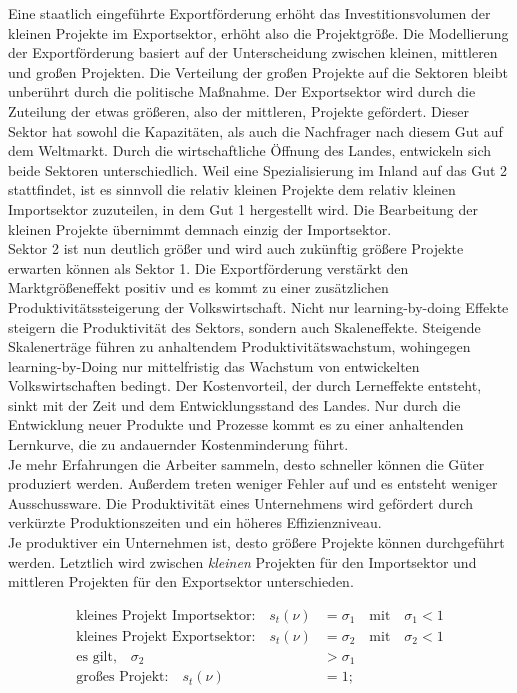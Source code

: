 Eine staatlich eingeführte Exportförderung erhöht das Investitionsvolumen der kleinen Projekte im Exportsektor, erhöht also die Projektgrö{\ss}e. Die Modellierung der Exportförderung basiert auf der Unterscheidung zwischen kleinen, mittleren und gro{\ss}en Projekten. Die Verteilung der gro{\ss}en Projekte auf die Sektoren bleibt unberührt durch die politische Ma{\ss}nahme. Der Exportsektor wird durch die Zuteilung der etwas grö{\ss}eren, also der mittleren, Projekte gefördert.  
Dieser Sektor hat sowohl die Kapazitäten, als auch die Nachfrager nach diesem Gut auf dem Weltmarkt. Durch die wirtschaftliche Öffnung des Landes, entwickeln sich beide Sektoren unterschiedlich. Weil eine Spezialisierung im Inland auf das Gut 2 stattfindet, ist es sinnvoll die relativ kleinen Projekte dem relativ kleinen Importsektor zuzuteilen, in dem Gut 1 hergestellt wird. Die Bearbeitung der kleinen Projekte übernimmt demnach einzig der Importsektor.\\
Sektor 2 ist nun deutlich grö{\ss}er und wird auch zukünftig grö{\ss}ere Projekte erwarten können als Sektor 1. Die Exportförderung verstärkt den Marktgrö{\ss}eneffekt positiv und es kommt zu einer zusätzlichen Produktivitätssteigerung der Volkswirtschaft.  Nicht nur learning-by-doing Effekte steigern die Produktivität des Sektors, sondern auch Skaleneffekte. Steigende Skalenerträge führen zu anhaltendem Produktivitätswachstum, wohingegen learning-by-Doing nur mittelfristig das Wachstum von entwickelten Volkswirtschaften bedingt. Der Kostenvorteil, der durch Lerneffekte entsteht, sinkt mit der Zeit und dem Entwicklungsstand des Landes. Nur durch die Entwicklung neuer Produkte und Prozesse kommt es zu einer anhaltenden Lernkurve, die zu andauernder Kostenminderung führt.\\ 


Je mehr Erfahrungen die Arbeiter sammeln, desto schneller können die Güter produziert werden. Au{\ss}erdem treten weniger Fehler auf und es entsteht weniger Ausschussware. Die Produktivität eines Unternehmens wird gefördert durch verkürzte  Produktionszeiten und ein höheres Effizienzniveau.\\


Je produktiver ein Unternehmen ist, desto grö{\ss}ere Projekte können durchgeführt werden. Letztlich wird zwischen \textit{kleinen} Projekten für den Importsektor und mittleren Projekten für den Exportsektor unterschieden.


	\begin{align*}
		\text{kleines Projekt Importsektor:}\quad s_t(\nu) &= \sigma_1 \quad\text{mit}\quad\sigma_1 < 1\\
		\text{kleines Projekt Exportsektor:} \quad s_t(\nu) &= \sigma_2 \quad\text{mit}\quad\sigma_2 < 1\\
		\text{es gilt,} \quad \sigma_2&>\sigma_1\\
		\text{gro{\ss}es Projekt:} \quad s_t(\nu) &= 1;
	\end{align*}


